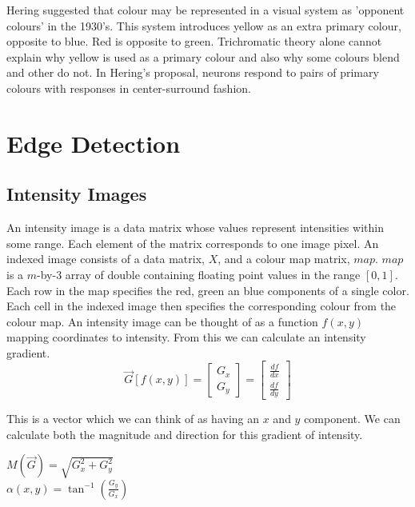 \documentclass{article}
\begin{document}
	\par 
	Hering suggested that colour may be represented in a visual system as 'opponent colours' in the 1930's. This system introduces yellow as an extra primary colour, opposite to blue. Red is opposite to green. Trichromatic theory alone cannot explain why yellow is used as a primary colour and also why some colours blend and other do not. In Hering's proposal, neurons respond to pairs of primary colours with responses in center-surround fashion.

	
	\section{Edge Detection}
	\subsection{Intensity Images}
	An intensity image is a data matrix whose values represent intensities within some range. Each element of the matrix corresponds to one image pixel. An indexed image consists of a data matrix, $X$, and a colour map matrix, $map$. $map$ is a $m$-by-3 array of double containing floating point values in the range $[0, 1]$. Each row in the map specifies the red, green an blue components of a single color. Each cell in the indexed image then specifies the corresponding colour from the colour map. An intensity image can be thought of as a function $f(x, y)$ mapping coordinates to intensity. From this we can calculate an intensity gradient.
	\begingroup
	\renewcommand*{\arraystretch}{1.5}
	\[ \overrightarrow{G}[f(x,y)] = \begin{bmatrix}G_{x} \\ G_{y} \end{bmatrix} = \begin{bmatrix} \frac{df}{dx} \\ \frac{df}{dy} \end{bmatrix} \]	
	\endgroup

	 This is a vector which we can think of as having an $x$ and $y$ component. We can calculate both the magnitude and direction for this gradient of intensity. 
	\begin{multicols}{2}
		\noindent
		\centering
			$M(\overrightarrow{G}) = \sqrt{G_{x}^{2} + G_{y}^{2}}$ \\
			$\alpha(x, y) = \tan^{-1}\left(\frac{G_y}{G_x}\right)$
	\end{multicols}
	
\end{document}
